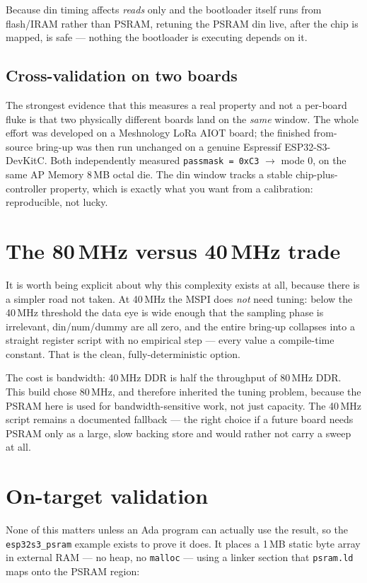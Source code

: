 Because din timing affects \emph{reads} only and the bootloader itself runs from
flash/IRAM rather than PSRAM, retuning the PSRAM din live, after the chip is mapped, is
safe --- nothing the bootloader is executing depends on it.

\subsection{Cross-validation on two boards}

The strongest evidence that this measures a real property and not a per-board fluke is
that two physically different boards land on the \emph{same} window. The whole effort
was developed on a Meshnology LoRa AIOT board; the finished from-source bring-up was
then run unchanged on a genuine Espressif ESP32-S3-DevKitC. Both independently measured
\texttt{passmask = 0xC3} $\rightarrow$ mode 0, on the same AP Memory 8\,MB octal die.
The din window tracks a stable chip-plus-controller property, which is exactly what you
want from a calibration: reproducible, not lucky.

\section{The 80\,MHz versus 40\,MHz trade}

It is worth being explicit about why this complexity exists at all, because there is a
simpler road not taken. At 40\,MHz the MSPI does \emph{not} need tuning: below the
40\,MHz threshold the data eye is wide enough that the sampling phase is irrelevant,
din/num/dummy are all zero, and the entire bring-up collapses into a straight register
script with no empirical step --- every value a compile-time constant. That is the
clean, fully-deterministic option.

The cost is bandwidth: 40\,MHz DDR is half the throughput of 80\,MHz DDR. This build
chose 80\,MHz, and therefore inherited the tuning problem, because the PSRAM here is
used for bandwidth-sensitive work, not just capacity. The 40\,MHz script remains a
documented fallback --- the right choice if a future board needs PSRAM only as a large,
slow backing store and would rather not carry a sweep at all.

\section{On-target validation}
\label{ch:psram-validate}

None of this matters unless an Ada program can actually use the result, so the
\texttt{esp32s3\_psram} example exists to prove it does. It places a 1\,MB static byte
array in external RAM --- no heap, no \texttt{malloc} --- using a linker section that
\texttt{psram.ld} maps onto the PSRAM region:

